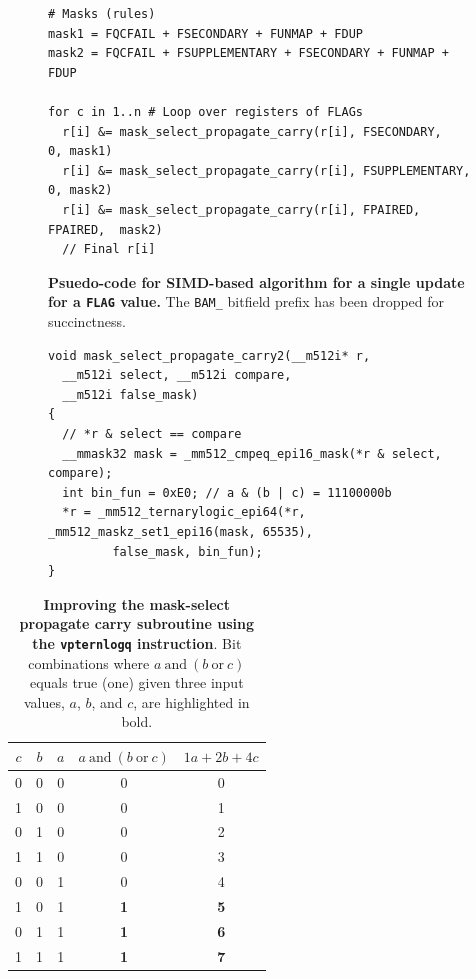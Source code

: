 \begin{figure}[h]
\begin{verbatim}
# Masks (rules)
mask1 = FQCFAIL + FSECONDARY + FUNMAP + FDUP
mask2 = FQCFAIL + FSUPPLEMENTARY + FSECONDARY + FUNMAP + FDUP

for c in 1..n # Loop over registers of FLAGs
  r[i] &= mask_select_propagate_carry(r[i], FSECONDARY,     0, mask1)
  r[i] &= mask_select_propagate_carry(r[i], FSUPPLEMENTARY, 0, mask2)
  r[i] &= mask_select_propagate_carry(r[i], FPAIRED, FPAIRED,  mask2)
  // Final r[i]
\end{verbatim}
\caption{\label{fig:propagate-carry-psuedocode}\textbf{Psuedo-code for SIMD-based
algorithm for a single update for a \texttt{FLAG} value.} The \texttt{BAM\_} bitfield prefix has been dropped for succinctness.}
\end{figure}

\begin{figure}[h]
\begin{verbatim}
void mask_select_propagate_carry2(__m512i* r, 
  __m512i select, __m512i compare, 
  __m512i false_mask)
{
  // *r & select == compare
  __mmask32 mask = _mm512_cmpeq_epi16_mask(*r & select, compare);
  int bin_fun = 0xE0; // a & (b | c) = 11100000b
  *r = _mm512_ternarylogic_epi64(*r, _mm512_maskz_set1_epi16(mask, 65535), 
         false_mask, bin_fun);
}
\end{verbatim}
\end{figure}

\begin{table}[h]
\centering
\caption{\label{tab:mask-select-propagate-carry-vptern}\textbf{Improving the mask-select propagate carry subroutine using the \texttt{vpternlogq} instruction}. Bit combinations where $a \mathrm{~and~} (b \mathrm{~or~} c)$ equals true (one) given three input values, $a$, $b$, and $c$, are highlighted in bold.}
\begin{tabular}{ccccc}
\toprule
 $c$ & $b$& $a$ & $a \mathrm{~and~} (b \mathrm{~or~} c)$ & $1a + 2b + 4c$\\\midrule
 0& 0& 0& 0& 0\\
 1& 0& 0& 0& 1\\
 0& 1& 0& 0& 2\\
 1& 1& 0& 0& 3\\
 0& 0& 1& 0& 4\\
 1& 0& 1& \textbf{1}& \textbf{5}\\
 0& 1& 1& \textbf{1}& \textbf{6}\\
 1& 1& 1& \textbf{1}& \textbf{7}\\\bottomrule
\end{tabular}
\end{table}

